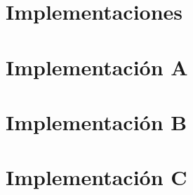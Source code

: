 \section{Implementaciones}

\section{Implementación A}
\section{Implementación B}
\section{Implementación C}
